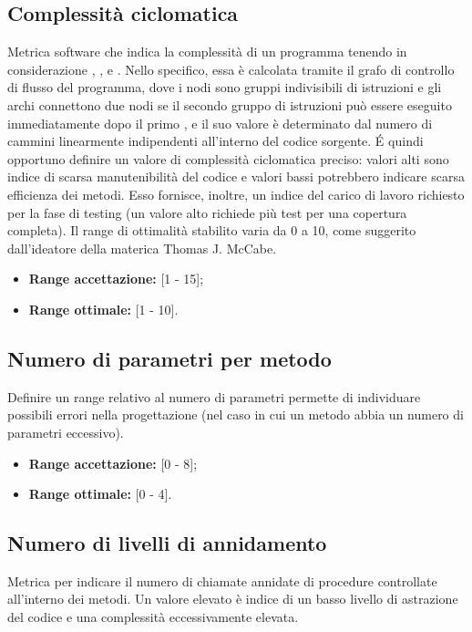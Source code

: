 \subsection{Complessità ciclomatica}
Metrica software che indica la complessità di un programma tenendo in considerazione , ,  e .
Nello specifico, essa è calcolata tramite il grafo di controllo di flusso del programma, dove i nodi sono gruppi indivisibili di istruzioni e gli archi connettono due nodi se il secondo gruppo di istruzioni può essere eseguito immediatamente dopo il primo , e il suo valore è determinato dal numero di cammini linearmente indipendenti all'interno del codice sorgente. 
\'E quindi opportuno definire un valore di complessità ciclomatica preciso: valori alti sono indice di scarsa manutenibilità del codice e valori bassi potrebbero indicare scarsa efficienza dei metodi.
Esso fornisce, inoltre, un indice del carico di lavoro richiesto per la fase di testing (un valore alto richiede più test per una copertura completa).
Il range di ottimalità stabilito varia da 0 a 10, come suggerito dall'ideatore della materica Thomas J. McCabe.  

\begin{itemize}
	\item \textbf{Range accettazione:} [1 - 15];
	\item \textbf{Range ottimale:} [1 - 10].
\end{itemize}

\subsection{Numero di parametri per metodo}
Definire un range relativo al numero di parametri permette di individuare possibili errori nella progettazione (nel caso in cui un metodo abbia un numero di parametri eccessivo).
 
\begin{itemize}
	\item \textbf{Range accettazione:} [0 - 8];
	\item \textbf{Range ottimale:} [0 - 4].
\end{itemize}  


\subsection{Numero di livelli di annidamento}
Metrica per indicare il numero di chiamate annidate di procedure controllate all'interno dei metodi.\newline
Un valore elevato è indice di un basso livello di astrazione del codice e una complessità eccessivamente elevata. 

